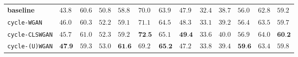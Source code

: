 \begin{table}[ht]
{\begin{tabular}{|l|lll|lll|lll|lll|}
\hline
\textbf{baseline} \cite{XianCVPR2018} 
& $43.8$ & $60.6$ & $50.8$ 
& $58.8$ & $70.0$ & $63.9$
& $47.9$ & $32.4$ & $38.7$
& $56.0$  & $62.8$ & $59.2$
\\

\texttt{cycle-WGAN} 
& $46.0$ & $60.3$ & $52.2$ %
& $59.1$ & $71.1$ & $64.5$ %
& $48.3$ & $33.1$ & $39.2$ %
& $56.4$ & $63.5$ & $59.7$ %
\\ 

\texttt{cycle-CLSWGAN} 
& $45.7$ & $61.0$ & $52.3$ 
& $59.2$ & $\textbf{72.5}$ & $65.1$ %
& $\textbf{49.4}$ & $33.6$ & $\mathbf{40.0}$
&$56.9$ & $64.0$ & $\textbf{60.2}$
 \\ 
 
\texttt{cycle-(U)WGAN} 
& $\textbf{47.9}$ & $59.3$ & $\mathbf{53.0}$ 
& $\textbf{61.6}$ & $69.2$ & $\textbf{65.2}$ %
& $47.2$ & $33.8$ & $39.4$ 
& $\textbf{59.6}$ & $63.4$ & $59.8$
 \\ \hline
 
              \end{tabular}
}
\end{table}
